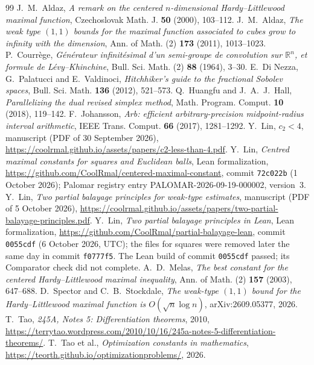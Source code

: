 \documentclass[11pt]{amsart}
\theoremstyle{definition}
\theoremstyle{remark}
\numberwithin{equation}{section}
\newcommand{\R}{\mathbb{R}}
\begin{document}
\begin{thebibliography}{99}
 J.~M.~Aldaz, \emph{A remark on the centered $n$-dimensional Hardy--Littlewood maximal function}, Czechoslovak Math. J. \textbf{50} (2000), 103--112.
 J.~M.~Aldaz, \emph{The weak type $(1,1)$ bounds for the maximal function associated to cubes grow to infinity with the dimension}, Ann. of Math. (2) \textbf{173} (2011), 1013--1023.
 P.~Courr\`ege, \emph{G\'en\'erateur infinit\'esimal d'un semi-groupe de convolution sur $\R^n$, et formule de L\'evy--Khinchine}, Bull. Sci. Math. (2) \textbf{88} (1964), 3--30.
 E.~Di Nezza, G.~Palatucci and E.~Valdinoci, \emph{Hitchhiker's guide to the fractional Sobolev spaces}, Bull. Sci. Math. \textbf{136} (2012), 521--573.
 Q.~Huangfu and J.~A.~J.~Hall, \emph{Parallelizing the dual revised simplex method}, Math. Program. Comput. \textbf{10} (2018), 119--142.
 F.~Johansson, \emph{Arb: efficient arbitrary-precision midpoint-radius interval arithmetic}, IEEE Trans. Comput. \textbf{66} (2017), 1281--1292.
 Y.~Lin, \emph{$c_2<4$}, manuscript (PDF of 30 September 2026), \url{https://coolrmal.github.io/assets/papers/c2-less-than-4.pdf}.
 Y.~Lin, \emph{Centred maximal constants for squares and Euclidean balls}, Lean formalization, \url{https://github.com/CoolRmal/centered-maximal-constant}, commit \texttt{72c022b} (1 October 2026); Palomar registry entry PALOMAR-2026-09-19-000002, version~3.
 Y.~Lin, \emph{Two partial balayage principles for weak-type estimates}, manuscript (PDF of 5 October 2026), \url{https://coolrmal.github.io/assets/papers/two-partial-balayage-principles.pdf}.
 Y.~Lin, \emph{Two partial balayage principles in Lean}, Lean formalization, \url{https://github.com/CoolRmal/partial-balayage-lean}, commit \texttt{0055cdf} (6 October 2026, UTC); the files for squares were removed later the same day in commit \texttt{f0777f5}. The Lean build of commit \texttt{0055cdf} passed; its Comparator check did not complete.
 A.~D.~Melas, \emph{The best constant for the centered Hardy--Littlewood maximal inequality}, Ann. of Math. (2) \textbf{157} (2003), 647--688.
 D.~Spector and C.~B.~Stockdale, \emph{The weak-type $(1,1)$ bound for the Hardy--Littlewood maximal function is $O(\sqrt n\log n)$}, arXiv:2609.05377, 2026.
 T.~Tao, \emph{245A, Notes 5: Differentiation theorems}, 2010, \url{https://terrytao.wordpress.com/2010/10/16/245a-notes-5-differentiation-theorems/}.
 T.~Tao et al., \emph{Optimization constants in mathematics}, \url{https://teorth.github.io/optimizationproblems/}, 2026.
\end{thebibliography}
\end{document}
